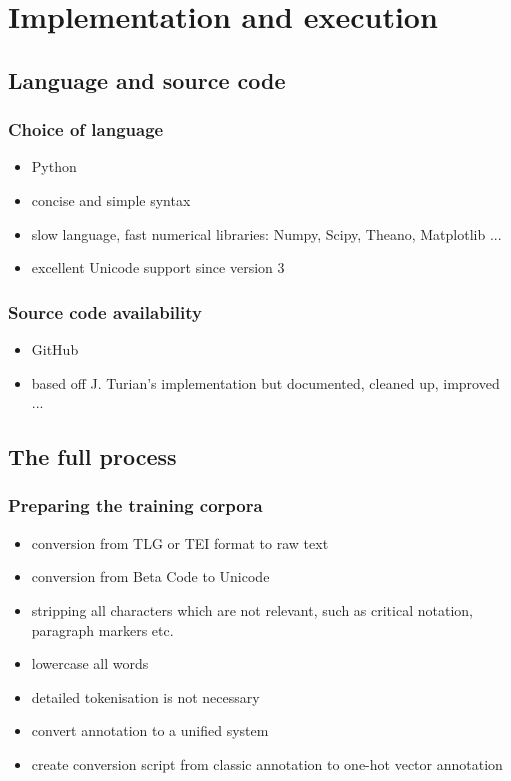 
\chapter{Implementation and execution}
\label{chp:implementation}

\section{Language and source code}
\label{sec:langsource}
\subsection{Choice of language}
\label{sec:language}

\begin{itemize}
\item Python
\item concise and simple syntax
\item slow language, fast numerical libraries: Numpy, Scipy, Theano, Matplotlib ...
\item excellent Unicode support since version 3
\end{itemize}

\subsection{Source code availability}
\label{sec:sourcecode}

\begin{itemize}
\item GitHub
\item based off J. Turian's implementation but documented, cleaned up, improved ...
\end{itemize}

\section{The full process}
\label{sec:process}

\subsection{Preparing the training corpora}
\label{sec:trainingcorpora}
\begin{itemize}
\item conversion from TLG or TEI format to raw text
\item conversion from Beta Code to Unicode
\item stripping all characters which are not relevant, such as
critical notation, paragraph markers etc.
\item lowercase all words
\item detailed tokenisation is not necessary
\item convert annotation to a unified system
\item create conversion script from classic annotation to one-hot vector annotation
\end{itemize}

